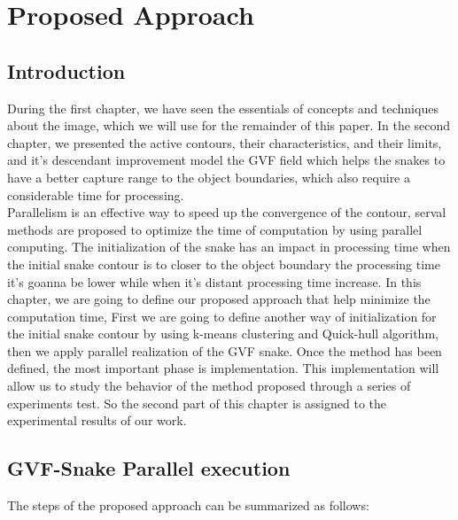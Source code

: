 
\chapter{Proposed Approach}\label{ch:proposed-approach}
\chead{}
\lhead{\bfseries \chaptername {\,} \thechapter }
\cfoot{\bfseries \thepage}
\rhead{}
\section{Introduction}\label{sec:introduction-ch3}
During the first chapter, we have seen the essentials of concepts and techniques
about the image, which we will use for the remainder of this paper. In the second
chapter, we presented the active contours, their characteristics, and their limits, and
it's descendant improvement model the GVF field which helps the snakes to have a
better capture range to the object boundaries, which also require a considerable
time for processing.\\
Parallelism is an effective way to speed up the convergence of the contour, serval
methods are proposed to optimize the time of computation by using parallel
computing. The initialization of the snake has an impact in processing time when the
initial snake contour is to closer to the object boundary the processing time it's
goanna be lower while when it's distant processing time increase.
In this chapter, we are going to define our proposed approach that help minimize the
computation time, First we are going to define another way of initialization for the
initial snake contour by using k-means clustering and Quick-hull algorithm, then we
apply parallel realization of the GVF snake.
Once the method has been defined, the most important phase is implementation.
This implementation will allow us to study the behavior of the method proposed
through a series of experiments test. So the second part of this chapter is assigned to
the experimental results of our work.
\section{GVF-Snake Parallel execution}\label{sec:gvf-snake-parallel-execution}
The steps of the proposed approach can be summarized as follows:

